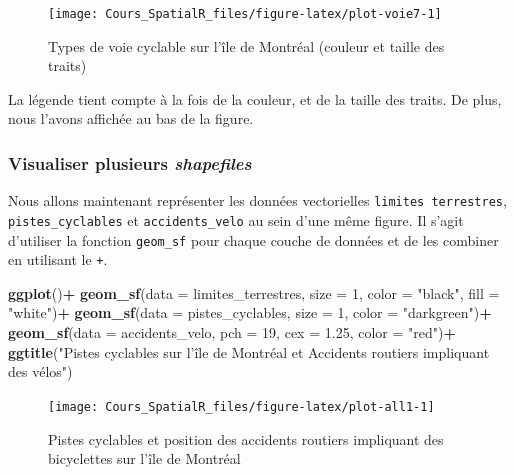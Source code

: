 \documentclass[
  12pt,
]{krantz}
\newenvironment{Shaded}{\begin{snugshade}}{\end{snugshade}}
\newcommand{\DataTypeTok}[1]{\textcolor[rgb]{0.13,0.29,0.53}{#1}}
\newcommand{\DecValTok}[1]{\textcolor[rgb]{0.00,0.00,0.81}{#1}}
\newcommand{\FloatTok}[1]{\textcolor[rgb]{0.00,0.00,0.81}{#1}}
\newcommand{\KeywordTok}[1]{\textcolor[rgb]{0.13,0.29,0.53}{\textbf{#1}}}
\newcommand{\NormalTok}[1]{#1}
\newcommand{\OperatorTok}[1]{\textcolor[rgb]{0.81,0.36,0.00}{\textbf{#1}}}
\newcommand{\StringTok}[1]{\textcolor[rgb]{0.31,0.60,0.02}{#1}}
\begin{document}
\begin{figure}

{\centering \texttt{[image: Cours\_SpatialR\_files/figure-latex/plot-voie7-1]} 

}

\caption{Types de voie cyclable sur l'île de Montréal (couleur et taille des traits)}\label{fig:plot-voie7}
\end{figure}

La légende tient compte à la fois de la couleur, et de la taille des traits. De plus, nous l'avons affichée au bas de la figure.

\hypertarget{visualiser-plusieurs-shapefiles}{%
\subsubsection*{\texorpdfstring{Visualiser plusieurs \emph{shapefiles}}{Visualiser plusieurs shapefiles}}\label{visualiser-plusieurs-shapefiles}}


Nous allons maintenant représenter les données vectorielles \texttt{limites\ terrestres}, \texttt{pistes\_cyclables} et \texttt{accidents\_velo} au sein d'une même figure. Il s'agit d'utiliser la fonction \texttt{geom\_sf} pour chaque couche de données et de les combiner en utilisant le \texttt{+}.

\begin{Shaded}
\begin{Highlighting}[]
\KeywordTok{ggplot}\NormalTok{()}\OperatorTok{+}
\StringTok{  }\KeywordTok{geom_sf}\NormalTok{(}\DataTypeTok{data =}\NormalTok{ limites_terrestres, }\DataTypeTok{size =} \DecValTok{1}\NormalTok{, }\DataTypeTok{color =} \StringTok{"black"}\NormalTok{, }\DataTypeTok{fill =} \StringTok{"white"}\NormalTok{)}\OperatorTok{+}
\StringTok{  }\KeywordTok{geom_sf}\NormalTok{(}\DataTypeTok{data =}\NormalTok{ pistes_cyclables, }\DataTypeTok{size =} \DecValTok{1}\NormalTok{, }\DataTypeTok{color =} \StringTok{"darkgreen"}\NormalTok{)}\OperatorTok{+}
\StringTok{  }\KeywordTok{geom_sf}\NormalTok{(}\DataTypeTok{data =}\NormalTok{ accidents_velo, }\DataTypeTok{pch =} \DecValTok{19}\NormalTok{, }\DataTypeTok{cex =} \FloatTok{1.25}\NormalTok{, }\DataTypeTok{color =} \StringTok{"red"}\NormalTok{)}\OperatorTok{+}
\StringTok{  }\KeywordTok{ggtitle}\NormalTok{(}\StringTok{"Pistes cyclables sur l'île de Montréal et Accidents routiers impliquant des vélos"}\NormalTok{)}
\end{Highlighting}
\end{Shaded}

\begin{figure}

{\centering \texttt{[image: Cours\_SpatialR\_files/figure-latex/plot-all1-1]} 

}

\caption{Pistes cyclables et position des accidents routiers impliquant des bicyclettes sur l'île de Montréal}\label{fig:plot-all1}
\end{figure}
\end{document}
